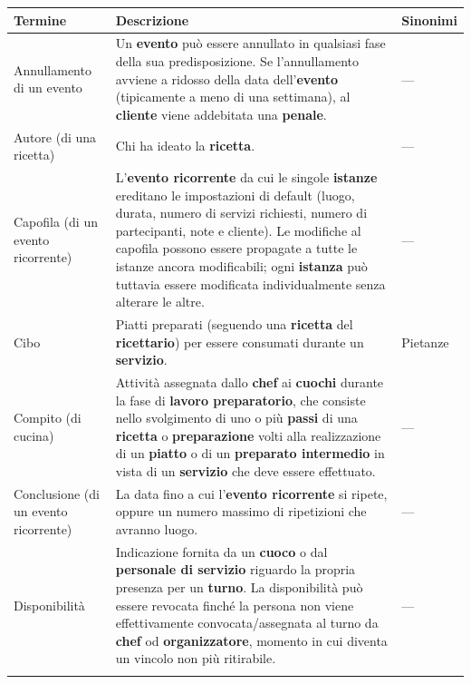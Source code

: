 \begin{longtable}{L{3.5cm} L{8.5cm} L{3cm}}
\toprule
\textbf{Termine} & \textbf{Descrizione} & \textbf{Sinonimi} \\
\midrule
\endhead
\bottomrule
\endfoot

Annullamento di un evento
& Un \textbf{evento} può essere annullato in qualsiasi fase della sua
  predisposizione. Se l'annullamento avviene a ridosso della data
  dell'\textbf{evento} (tipicamente a meno di una settimana), al
  \textbf{cliente} viene addebitata una \textbf{penale}.
& — \\
\addlinespace

Autore (di una ricetta)
& Chi ha ideato la \textbf{ricetta}.
& — \\
\addlinespace

Capofila (di un evento ricorrente)
& L'\textbf{evento ricorrente} da cui le singole \textbf{istanze}
  ereditano le impostazioni di default (luogo, durata, numero di
  servizi richiesti, numero di partecipanti, note e cliente). Le modifiche al
  capofila possono essere propagate a tutte le istanze ancora
  modificabili; ogni \textbf{istanza} può tuttavia essere modificata
  individualmente senza alterare le altre.
& — \\
\addlinespace

Cibo
& Piatti preparati (seguendo una \textbf{ricetta} del \textbf{ricettario})
  per essere consumati durante un \textbf{servizio}.
& Pietanze \\
\addlinespace

Compito (di cucina)
& Attività assegnata dallo \textbf{chef} ai \textbf{cuochi} durante la fase
  di \textbf{lavoro preparatorio}, che consiste nello svolgimento di uno o
  più \textbf{passi} di una \textbf{ricetta} o \textbf{preparazione} volti
  alla realizzazione di un \textbf{piatto} o di un \textbf{preparato
  intermedio} in vista di un \textbf{servizio} che deve essere effettuato.
& — \\
\addlinespace

Conclusione (di un evento ricorrente)
& La data fino a cui l'\textbf{evento ricorrente} si ripete, oppure un
  numero massimo di ripetizioni che avranno luogo.
& — \\
\addlinespace

Disponibilità
& Indicazione fornita da un \textbf{cuoco} o dal \textbf{personale di
  servizio} riguardo la propria presenza per un \textbf{turno}. La
  disponibilità può essere revocata finché la persona non viene
  effettivamente convocata/assegnata al turno da \textbf{chef} od
  \textbf{organizzatore}, momento in cui diventa un vincolo non più
  ritirabile.
& — \\
\addlinespace


\end{longtable}
